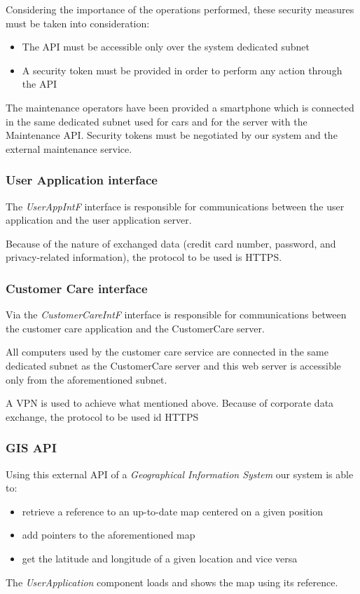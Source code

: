 Considering the importance of the operations performed, these security measures must be taken into consideration:
\begin{itemize}
	\item The API must be accessible only over the system dedicated subnet
	\item A security token must be provided in order to perform any action through the API
\end{itemize}
The maintenance operators have been provided a smartphone which is connected in the same dedicated subnet used for cars and for the server with the Maintenance API.
Security tokens must be negotiated by our system and the external maintenance service.

\subsubsection{User Application interface}
The \emph{UserAppIntF} interface is responsible for communications between the user application and the user application server.

Because of the nature of exchanged data (credit card number, password, and privacy-related information), the protocol to be used is HTTPS.

\subsubsection{Customer Care interface}
Via the \emph{CustomerCareIntF} interface is responsible for communications between the customer care application and the CustomerCare server.

All computers used by the customer care service are connected in the same dedicated subnet as the CustomerCare server and this web server is accessible only from the aforementioned subnet. 

A VPN is used to achieve what mentioned above. Because of corporate data exchange, the protocol to be used id HTTPS

\subsubsection{GIS API}
\label{sec:gis}
Using this external API of a \emph{Geographical Information System} our system is able to:
\begin{itemize}
	\item retrieve a reference to an up-to-date map centered on a given position
	\item add pointers to the aforementioned map
	\item get the latitude and longitude of a given location and vice versa
\end{itemize}
The \emph{UserApplication} component loads and shows the map using its reference.

